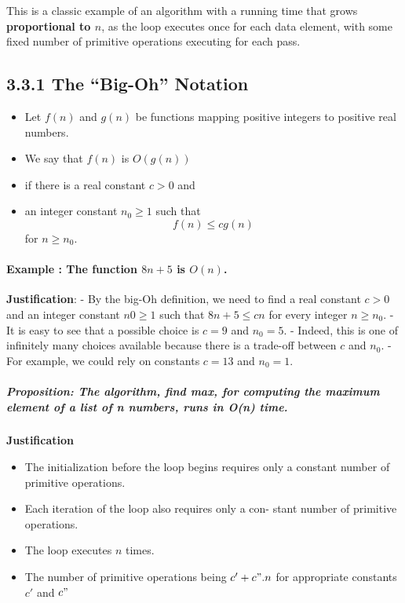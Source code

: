 \documentclass[11pt]{article}
\providecommand{\tightlist}{%
      \setlength{\itemsep}{0pt}\setlength{\parskip}{0pt}}
\begin{document}
    This is a classic example of an algorithm with a running time that grows
\textbf{proportional to \(n\)}, as the loop executes once for each data
element, with some fixed number of primitive operations executing for
each pass.

    \hypertarget{the-big-oh-notation}{%
\subsection{3.3.1 The ``Big-Oh'' Notation}\label{the-big-oh-notation}}

\begin{itemize}
\tightlist
\item
  Let \(f(n)\) and \(g(n)\) be functions mapping positive integers to
  positive real numbers.
\item
  We say that \(f(n)\) is \(O(g(n))\)
\item
  if there is a real constant \(c > 0\) and
\item
  an integer constant \(n_0 \ge 1\) such that \[
  f(n)\le cg(n) 
  \] for \(n\ge n_0\).
\end{itemize}

    \hypertarget{example-the-function-8n-5-is-on.}{%
\paragraph{\texorpdfstring{Example : The function \(8n + 5\) is
\(O(n)\).}{Example : The function 8n + 5 is O(n).}}\label{example-the-function-8n-5-is-on.}}

\textbf{Justification}: - By the big-Oh definition, we need to find a
real constant \(c > 0\) and an integer constant \(n0\ge 1\) such that
\(8n+5 \le cn\) for every integer \(n\ge n_0\). - It is easy to see that
a possible choice is \(c = 9\) and \(n_0 = 5\). - Indeed, this is one of
infinitely many choices available because there is a trade-off between
\(c\) and \(n_0\). - For example, we could rely on constants \(c = 13\)
and \(n_0 = 1\).

    \hypertarget{proposition-the-algorithm-find-max-for-computing-the-maximum-element-of-a-list-of-n-numbers-runs-in-on-time.}{%
\subparagraph{Proposition: The algorithm, find max, for computing the
maximum element of a list of n numbers, runs in O(n)
time.}\label{proposition-the-algorithm-find-max-for-computing-the-maximum-element-of-a-list-of-n-numbers-runs-in-on-time.}}

\textbf{Justification}

\begin{itemize}
\tightlist
\item
  The initialization before the loop begins requires only a constant
  number of primitive operations.
\item
  Each iteration of the loop also requires only a con- stant number of
  primitive operations.
\item
  The loop executes \(n\) times.
\item
  The number of primitive operations being \(c' + c".n\) for appropriate
  constants \(c'\) and \(c"\)
\end{itemize}
\end{document}
